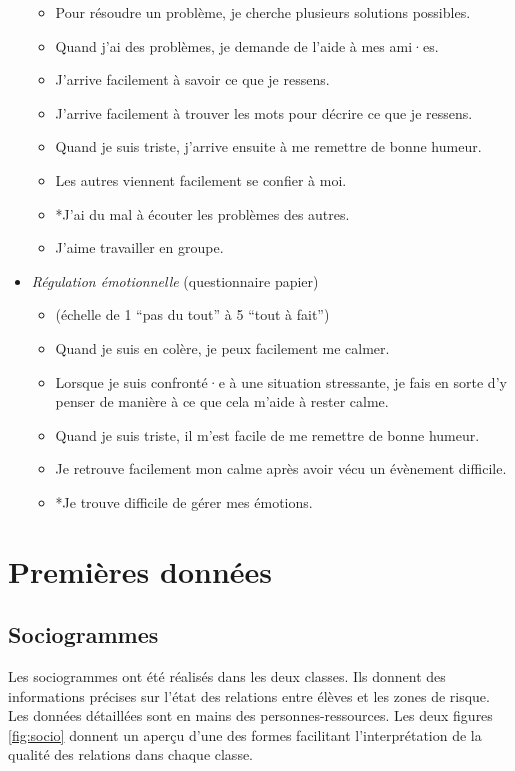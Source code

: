 \documentclass[
]{article}
\begin{document}
\begin{itemize}
\begin{itemize}
  \item
    Pour résoudre un problème, je cherche plusieurs solutions possibles.
  \item
    Quand j'ai des problèmes, je demande de l'aide à mes ami·es.
  \item
    J'arrive facilement à savoir ce que je ressens.
  \item
    J'arrive facilement à trouver les mots pour décrire ce que je ressens.
  \item
    Quand je suis triste, j'arrive ensuite à me remettre de bonne humeur.
  \item
    Les autres viennent facilement se confier à moi.
  \item
    *J'ai du mal à écouter les problèmes des autres.
  \item
    J'aime travailler en groupe.
  \end{itemize}
\item
  \emph{Régulation émotionnelle} (questionnaire papier)

  \begin{itemize}
  \item
    (échelle de 1 ``pas du tout'' à 5 ``tout à fait'')
  \item
    Quand je suis en colère, je peux facilement me calmer.
  \item
    Lorsque je suis confronté·e à une situation stressante, je fais en sorte d'y penser de manière à ce que cela m'aide à rester calme.
  \item
    Quand je suis triste, il m'est facile de me remettre de bonne humeur.
  \item
    Je retrouve facilement mon calme après avoir vécu un évènement difficile.
  \item
    *Je trouve difficile de gérer mes émotions.
  \end{itemize}
\end{itemize}

\hypertarget{premiuxe8res-donnuxe9es}{%
\section{Premières données}\label{premiuxe8res-donnuxe9es}}

\hypertarget{sociogrammes}{%
\subsection{Sociogrammes}\label{sociogrammes}}

Les sociogrammes ont été réalisés dans les deux classes. Ils donnent des informations précises sur l'état des relations entre élèves et les zones de risque. Les données détaillées sont en mains des personnes-ressources. Les deux figures \ref{fig:socio} donnent un aperçu d'une des formes facilitant l'interprétation de la qualité des relations dans chaque classe.
\end{document}
